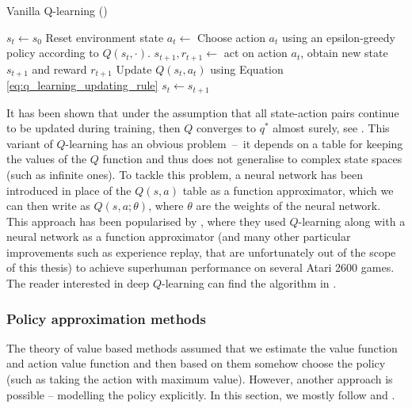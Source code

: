 \renewcommand{\algorithmicrequire}{\textbf{Input:}}
\renewcommand{\algorithmicensure}{\textbf{Output:}}


\begin{algorithm}[H]
\small
\caption{Vanilla Q-learning (\cite[p. 131]{sutton2018reinforcement})}\label{alg:q_learning}
\begin{algorithmic}
\Require{Choose the learning rate $\varphi \in (0,1]$ and exploration parameter $\epsilon>0$, number of episodes, initialise $Q(s, a) \, \mathrm{randomly}, s \in \{s \, \mathrm{for} \,  s \, \mathrm{in} \, \mathcal{S} \, \mathrm{if} \, s \, \mathrm{is \, not \, terminal}\}$ and $Q(s,a)=0$ for $s$ terminal, $a \in \mathcal{A}$ (terminal state of the environment means that the episode is finished).}
\State $s_t \leftarrow s_0$ Reset environment state 
\State $a_t \leftarrow$ Choose action $a_t$ using an epsilon-greedy policy according to $Q(s_t,\cdot).$
\State $s_{t+1}, r_{t+1} \leftarrow$ act on action $a_t$, obtain new state $s_{t+1}$ and reward $r_{t+1} $
\State Update $Q(s_t,a_t)$ using Equation \ref{eq:q_learning_updating_rule}
\State $s_t \leftarrow s_{t+1}$
\EndWhile
\EndFor
\end{algorithmic}
\end{algorithm}
It has been shown that under the assumption that all state-action pairs continue to be updated during training, then $Q$ converges to $q^*$ almost surely, see \cite[p. 131]{sutton2018reinforcement}. This variant of $Q$-learning has an obvious problem~--~it depends on a table for keeping the values of the $Q$ function and thus does not generalise to complex state spaces (such as infinite ones). To tackle this problem, a neural network has been introduced in place of the $Q(s,a)$ table as a function approximator, which we can then write as $Q(s,a;\theta)$, where $\theta$ are the weights of the neural network. This approach has been popularised by \cite{deep_q_learning_paper}, where they used $Q$-learning along with a neural network as a function approximator (and many other particular improvements such as experience replay, that are unfortunately out of the scope of this thesis) to achieve superhuman performance on several Atari 2600 games. The reader interested in deep $Q$-learning can find the algorithm in \cite[Algorithm 1]{deep_q_learning_paper}.

\subsubsection{Policy approximation methods}
The theory of value based methods assumed that we estimate the value function and action value function and then based on them somehow choose the policy (such as taking the action with maximum value). However, another approach is possible -- modelling the policy explicitly. In this section, we mostly follow  \cite[Chapter 13]{sutton2018reinforcement} and \cite[Section 2]{proximal_policy_optimization}.

